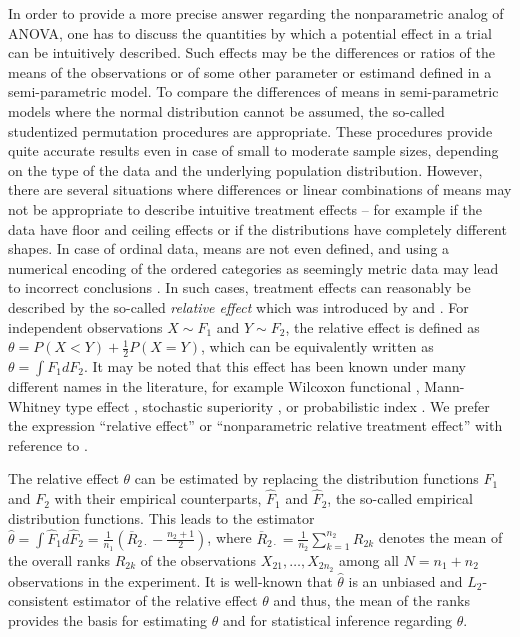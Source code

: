 In order to provide a more precise answer %
regarding the nonparametric analog of ANOVA, one has to discuss the quantities 
by which a potential effect in a trial can be intuitively described. Such 
effects may be the differences or ratios of the means of the observations or of 
some other parameter or estimand defined in a semi-parametric model. To compare the 
differences of means in semi-parametric models where the normal distribution 
cannot be assumed, the so-called studentized permutation procedures 
\citep{janssen1997studentized,pauly2015asymptotic,smaga2015wald} are 
appropriate. These procedures provide quite accurate results even in case of 
small to moderate sample sizes, depending on the type of the data 
and the underlying population distribution. However, there are several 
situations where differences or linear combinations of means may not be 
appropriate to describe intuitive treatment effects -- for example if the data 
have floor and ceiling effects or if the distributions have completely 
different shapes. In case of ordinal data, means are not even defined, and 
using a numerical encoding of the ordered categories as seemingly metric data 
may lead to incorrect conclusions \citep{kahler2008parametric}. In such cases, 
treatment effects can reasonably be described by the so-called 
{\it relative effect} which was introduced by \cite{mann1947test} and 
\cite{putter1955treatment}. For independent observations $X \sim F_1$ and $Y 
\sim F_2$, the relative effect is defined as $\theta = P(X<Y)+\frac12 P(X=Y)$, 
which can be equivalently written as $\theta = \int F_1 dF_2$. It may be noted 
that this effect has been known under many different names in the literature, for example 
Wilcoxon functional \citep{janssen1999nonparametric}, Mann-Whitney type effect 
\citep{dobler2019nonparametric}, stochastic superiority \citep{d2006mann}, or 
probabilistic index \citep{acion2006probabilistic, thas2012probabilistic}. We 
prefer the expression ``relative effect'' or ``nonparametric relative treatment 
effect'' with reference to \cite{birnbaum1957bounds}.

The relative effect $\theta$ can be estimated by replacing the 
distribution functions $F_1$ and $F_2$ with their empirical counterparts, 
$\widehat{F}_1$ and $\widehat{F}_2$, the so-called empirical distribution 
functions. This leads to the estimator $\widehat{\theta} = \int \widehat{F}_1 d 
\widehat{F}_2 = \frac1{n_1} \left(\overline{R}_{2\cdot}-\frac{n_2+1}2 \right)$, 
where $\overline{R}_{2\cdot} = \frac1{n_2} \sum_{k=1}^{n_2} R_{2k}$ denotes the 
mean of the overall ranks $R_{2k}$ of the observations $X_{21}, \ldots, 
X_{2n_2}$ among all $N=n_1+n_2$ observations in the experiment. It is 
well-known that $\widehat{\theta}$ is an unbiased and $L_2$-consistent 
estimator  of the relative effect $\theta$ and thus, the mean of the ranks 
provides the basis for estimating $\theta$ and for statistical inference 
regarding $\theta$. 

